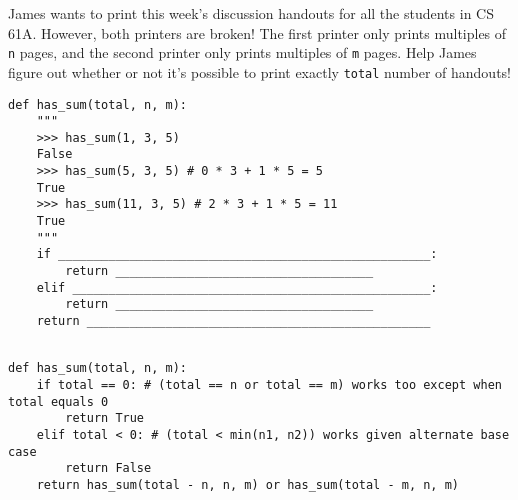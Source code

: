 \begin{blocksection}
\question James wants to print this week's discussion handouts for all the students in CS 61A.
However, both printers are broken! The first printer only prints multiples of \lstinline$n$
pages, and the second printer only prints multiples of \lstinline$m$ pages. Help James figure
out whether or not it's possible to print exactly \lstinline$total$ number of handouts! \\

\begin{lstlisting}
def has_sum(total, n, m):
    """
    >>> has_sum(1, 3, 5)
    False
    >>> has_sum(5, 3, 5) # 0 * 3 + 1 * 5 = 5
    True
    >>> has_sum(11, 3, 5) # 2 * 3 + 1 * 5 = 11
    True
    """
    if ____________________________________________________:
        return ____________________________________
    elif __________________________________________________:
        return ____________________________________
    return ________________________________________________
    
\end{lstlisting}

\begin{solution}[1.5in]
\begin{lstlisting}
def has_sum(total, n, m):
    if total == 0: # (total == n or total == m) works too except when total equals 0
        return True
    elif total < 0: # (total < min(n1, n2)) works given alternate base case
        return False
    return has_sum(total - n, n, m) or has_sum(total - m, n, m)
\end{lstlisting}
\end{solution}
\end{blocksection}
